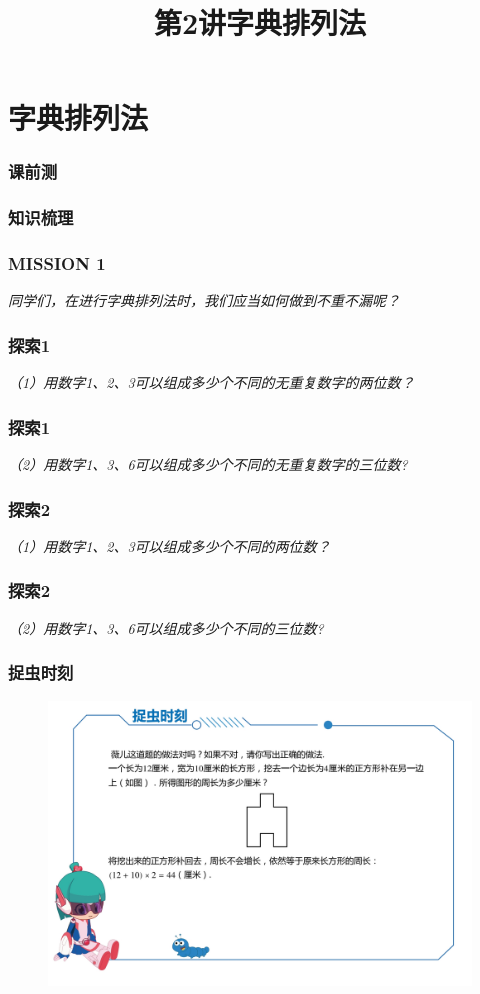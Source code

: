 \section{字典排列法}

\title[第2讲\quad 字典排列法]{第2讲\quad 字典排列法} 
\author{}
\date{}
\begin{frame}
    \titlepage
\end{frame}

\begin{frame}
    \frametitle{课前测}
    \begin{figure}[H]
        \centering 
    \end{figure}
\end{frame}

\begin{frame}
    \frametitle{知识梳理}
\end{frame}

\begin{frame}
    \frametitle{MISSION 1}
    \textit{同学们，在进行字典排列法时，我们应当如何做到不重不漏呢？}
\end{frame}

\begin{frame}
    \frametitle{探索1}
    \textit{（1）用数字1、2、3可以组成多少个不同的无重复数字的两位数？}
\end{frame}

\begin{frame}
    \frametitle{探索1}
    \textit{（2）用数字1、3、6可以组成多少个不同的无重复数字的三位数?}
\end{frame}

\begin{frame}
    \frametitle{探索2}
    \textit{（1）用数字1、2、3可以组成多少个不同的两位数？}
\end{frame}

\begin{frame}
    \frametitle{探索2}
    \textit{（2）用数字1、3、6可以组成多少个不同的三位数?}
\end{frame}

\begin{frame}
    \frametitle{捉虫时刻}
    \begin{figure}[H] 
        \centering
        \includegraphics[width=1\textwidth]{./pics/Chapter_1/zhuochong1.png}
    \end{figure}
\end{frame}

